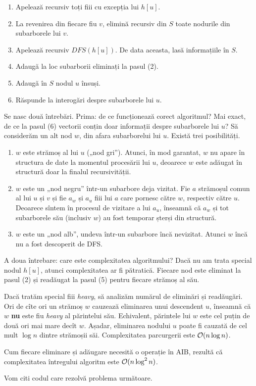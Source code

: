 \documentclass[../main.tex]{subfiles}
\begin{document}
\begin{enumerate}
  \item Apelează recursiv toți fiii cu excepția lui $h[u]$.

  \item La revenirea din fiecare fiu $v$, elimină recursiv din $S$ toate nodurile din subarborele lui $v$.

  \item Apelează recursiv $DFS(h[u])$. De data aceasta, lasă informațiile în $S$.

  \item Adaugă la loc subarborii eliminați la pasul (2).

  \item Adaugă în $S$ nodul $u$ însuși.

  \item Răspunde la interogări despre subarborele lui $u$.
\end{enumerate}

Se nasc două întrebări. Prima: de ce funcționează corect algoritmul? Mai exact, de ce la pasul (6) vectorii conțin doar informații despre subarborele lui $u$? Să considerăm un alt nod $w$, din afara subarborelui lui $u$. Există trei posibilități.

\begin{enumerate}
  \item $w$ este strămoș al lui $u$ („nod gri”). Atunci, în mod garantat, $w$ nu apare în structura de date la momentul procesării lui $u$, deoarece $w$ este adăugat în structură doar la finalul recursivității.

  \item $w$ este un „nod negru” într-un subarbore deja vizitat. Fie $a$ strămoșul comun al lui $u$ și $v$ și fie $a_w$ și $a_u$ fiii lui $a$ care pornesc către $w$, respectiv către $u$. Deoarece sîntem în procesul de vizitare a lui $a_u$, înseamnă că $a_w$ și tot subarborele său (inclusiv $w$) au fost temporar șterși din structură.

  \item $w$ este un „nod alb”, undeva într-un subarbore încă nevizitat. Atunci $w$ încă nu a fost descoperit de DFS.
\end{enumerate}

A doua întrebare: care este complexitatea algoritmului? Dacă nu am trata special nodul $h[u]$, atunci complexitatea ar fi pătratică. Fiecare nod este eliminat la pasul (2) și readăugat la pasul (5) pentru fiecare strămoș al său.

Dacă tratăm special fiii \textit{heavy}, să analizăm numărul de eliminări și readăugări. Ori de cîte ori un strămoș $w$ cauzează eliminarea unui descendent $u$, înseamnă că $w$ \textbf{nu} este fiu \textit{heavy} al părintelui său. Echivalent, părintele lui $w$ este cel puțin de două ori mai mare decît $w$. Așadar, eliminarea nodului $u$ poate fi cauzată de cel mult $\log n$ dintre strămoșii săi. Complexitatea parcurgerii este $\mathcal{O}(n \log n)$.

Cum fiecare eliminare și adăugare necesită o operație în AIB, rezultă că complexitatea întregului algoritm este $\mathcal{O}(n \log^2 n)$.

Vom citi codul care rezolvă problema următoare.
\end{document}
